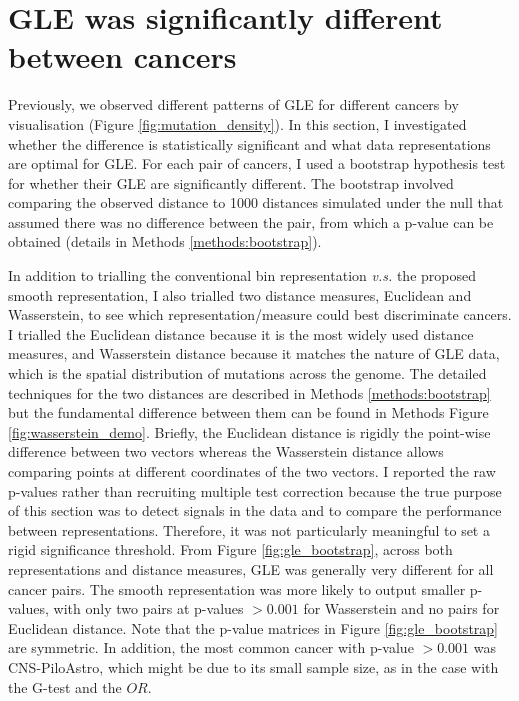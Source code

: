 

\section{GLE was significantly different between cancers}\label{gle:bootstrap}
Previously, we observed different patterns of GLE for different cancers by visualisation (Figure \ref{fig:mutation_density}). In this section, I investigated whether the difference is statistically significant and what data representations are optimal for GLE. For each pair of cancers, I used a bootstrap hypothesis test for whether their GLE are significantly different. The bootstrap involved comparing the observed distance to 1000 distances simulated under the null that assumed there was no difference between the pair, from which a p-value can be obtained (details in Methods \ref{methods:bootstrap}).

In addition to trialling the conventional bin representation \textit{v.s.} the proposed smooth representation, I also trialled two distance measures, Euclidean and Wasserstein, to see which representation/measure could best discriminate cancers. I trialled the Euclidean distance because it is the most widely used distance measures, and Wasserstein distance because it matches the nature of GLE data, which is the spatial distribution of mutations across the genome. The detailed techniques for the two distances are described in Methods \ref{methods:bootstrap} but the fundamental difference between them can be found in Methods Figure \ref{fig:wasserstein_demo}. Briefly, the Euclidean distance is rigidly the point-wise difference between two vectors whereas the Wasserstein distance allows comparing points at different coordinates of the two vectors. I reported the raw p-values rather than recruiting multiple test correction because the true purpose of this section was to detect signals in the data and to compare the performance between representations. Therefore, it was not particularly meaningful to set a rigid significance threshold. From Figure \ref{fig:gle_bootstrap}, across both representations and distance measures, GLE was generally very different for all cancer pairs. The smooth representation was more likely to output smaller p-values, with only two pairs at p-values $>0.001$ for Wasserstein and no pairs for Euclidean distance. Note that the p-value matrices in Figure \ref{fig:gle_bootstrap} are symmetric. In addition, the most common cancer with p-value $>0.001$ was CNS-PiloAstro, which might be due to its small sample size, as in the case with the G-test and the $OR$. 


